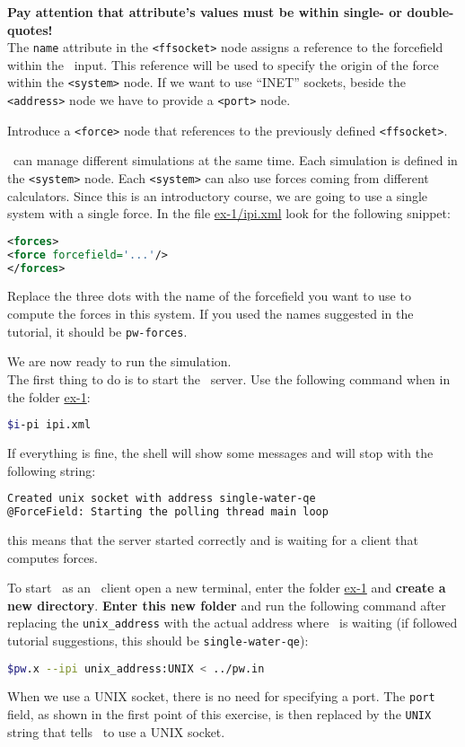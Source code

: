 \documentclass{article}
\begin{document}
\begin{Exercise}[label={i-pi},title={PIMD: a client/server approach}]
\textbf{Pay attention that attribute's values must be within single- or
double-quotes!}\\


The \texttt{name} attribute in the \texttt{<ffsocket>} node assigns a
reference to the forcefield within the \ipi\ input. This reference
will be used to specify the origin of the force within the
\texttt{<system>} node. If we want to use ``INET'' sockets, beside the
\texttt{<address>} node we have to provide a \texttt{<port>} node.


\Question
Introduce a \texttt{<force>} node that references to the previously
 defined \texttt{<ffsocket>}.

\ipi\ can manage different simulations at the same time. Each
simulation is defined in the \texttt{<system>} node. Each
\texttt{<system>} can also use forces coming from different
calculators. Since this is an introductory course, we are going to use
a single system with a single force. In the file \url{ex-1/ipi.xml}
look for the following snippet:
\begin{lstlisting}[language=xml]
<forces>
<force forcefield='...'/>
</forces>
\end{lstlisting}
Replace the three dots with the name of the forcefield you want to use
to compute the forces in this system. If you used the names suggested
in the tutorial, it should be \texttt{pw-forces}.

\Question
We are now ready to run the simulation.\\

The first thing to do is to start the \ipi\ server. Use the following
command when in the folder \url{ex-1}:
\begin{lstlisting}[language=bash]
$i-pi ipi.xml
\end{lstlisting}%
If everything is fine, the shell will show some messages and will stop
with the following string:
\begin{lstlisting}[language=bash]
Created unix socket with address single-water-qe
@ForceField: Starting the polling thread main loop
\end{lstlisting}
this means that the server started correctly and is waiting for a
client that computes forces.

To start \pwx\ as an \ipi\ client open a new terminal, enter the
folder \url{ex-1} and \textbf{create a new directory}. \textbf{Enter this new folder} and run the
following command after replacing the \texttt{unix\_address} with the
actual address where \ipi\ is waiting (if followed tutorial
suggestions, this should be \texttt{single-water-qe}):
\begin{lstlisting}[language=bash]
$pw.x --ipi unix_address:UNIX < ../pw.in
\end{lstlisting}%
When we use a UNIX socket, there is no need for specifying a port. The
\texttt{port} field, as shown in the first point of this exercise, is
then replaced by the \texttt{UNIX} string that tells \pwx\ to use a
UNIX socket. \\


\end{Exercise}
\end{document}

